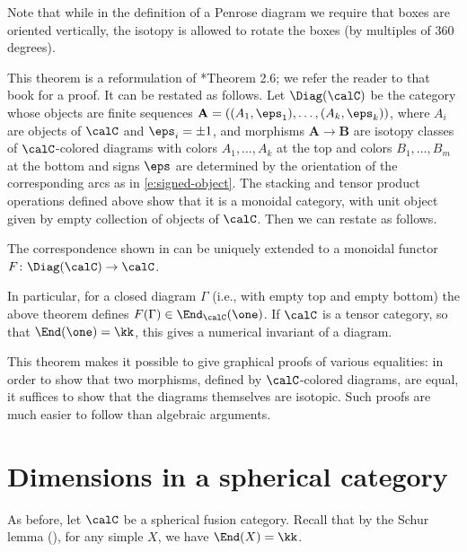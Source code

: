Note that while in the definition of a Penrose diagram we require that boxes
are oriented vertically, the isotopy is allowed to rotate the boxes (by
multiples of 360 degrees).

This theorem is a reformulation of *{Theorem 2.6}; we
refer the reader to that book for a proof. It can
be restated as follows. Let $\Diag(\calC)$ be the category whose objects are finite
sequences $\mathbf{A}=((A_1, \eps_1), \dots, (A_k, \eps_k))$, where $A_i$ are
objects of $\calC$ and $\eps_i=\pm 1$, and morphisms $\mathbf{A}\to \mathbf{B}$
are isotopy classes of $\calC$-colored diagrams with colors $A_1, \dots, A_k$ at
the top and colors $B_1, \dots, B_m$ at the bottom and signs $\eps$ are
determined by the orientation of the corresponding arcs as in
\eqref{e:signed-object}. The stacking and tensor product operations defined
above show that it is a monoidal category, with unit object given by empty
collection of objects of $\calC$. Then we can restate
 as follows.

\begin{theorem}\label{t:graphical-calculus2}
  The correspondence shown in  can be uniquely extended to
  a monoidal functor $F\colon \Diag(\calC)\to \calC$.
\end{theorem}


In particular, for a closed diagram $\Gamma$ (i.e., with empty top and empty
bottom) the above theorem defines $F(\Gamma)\in \End_\calC(\one)$. If $\calC$
is a tensor category, so that $\End(\one)=\kk$, this gives a numerical invariant
of a diagram.

This theorem makes it possible to give graphical proofs of various equalities:
in order to show that two morphisms, defined by $\calC$-colored diagrams, are
equal, it suffices to show that the diagrams themselves are isotopic. Such
proofs are much easier to follow than algebraic arguments.






\section{Dimensions in a spherical category}\label{s:spherical-basic}

As before, let $\calC$ be a spherical fusion category.
Recall that by the Schur lemma (),
for any simple $X$, we have $\End(X)=\kk$.

